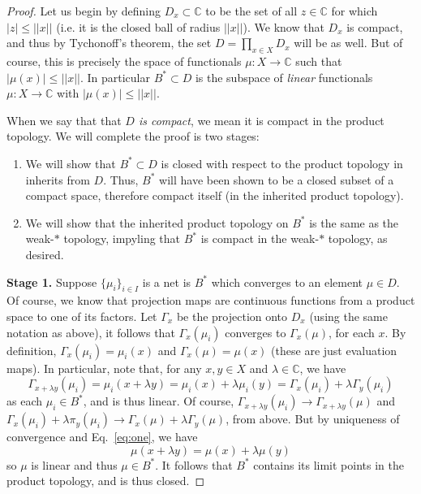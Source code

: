 \documentclass[aps,pra,showpacs,notitlepage,onecolumn,superscriptaddress,nofootinbib]{revtex4-1}
\theoremstyle{definition}
\begin{document}
\begin{proof}
  Let us begin by defining $D_x \subset \mathbb{C}$ to be the set of all $z \in \mathbb{C}$ for which $|z| \leq ||x||$ (i.e. it is the closed ball of radius $||x||$).
  We know that $D_x$ is compact, and thus by Tychonoff's theorem, the set $D = \prod_{x \in X} D_x$ will be as well. But of course, this is precisely the space of functionals $\mu : X \rightarrow \mathbb{C}$
  such that $|\mu(x)| \leq ||x||$. In particular $B^{*} \subset D$ is the subspace of \emph{linear} functionals $\mu : X \rightarrow \mathbb{C}$ with $|\mu(x)| \leq ||x||$.

  When we say that that \emph{$D$ is compact}, we mean it is compact in the product topology. We will complete the proof is two stages:
  \begin{enumerate}
  \item We will show that $B^{*} \subset D$ is closed with respect to the product topology in inherits from $D$. Thus, $B^{*}$ will
    have been shown to be a closed subset of a compact space, therefore compact itself (in the inherited product topology).
  \item We will show that the inherited product topology on $B^{*}$ is the same as the weak-$*$ topology, impyling that $B^{*}$ is compact in
    the weak-$*$ topology, as desired.
  \end{enumerate}
  \textbf{Stage 1.} Suppose $\{\mu_i\}_{i \in I}$ is a net is $B^{*}$ which converges to an element $\mu \in D$. Of course, we know that projection
  maps are continuous functions from a product space to one of its factors. Let $\Gamma_x$ be the projection onto $D_x$ (using the same notation as above), it follows that $\Gamma_x(\mu_i)$
  converges to $\Gamma_x(\mu)$, for each $x$. By definition, $\Gamma_x(\mu_i) = \mu_i(x)$ and $\Gamma_x(\mu) = \mu(x)$ (these are just evaluation maps). In particular,
  note that, for any $x, y \in X$ and $\lambda \in \mathbb{C}$, we have
  \begin{equation}
    \label{eq:one}
    \Gamma_{x + \lambda y}(\mu_i) = \mu_i(x + \lambda y) = \mu_i(x) + \lambda \mu_i(y) = \Gamma_x(\mu_i) + \lambda \Gamma_y(\mu_i)
  \end{equation}
  as each $\mu_i \in B^{*}$, and is thus linear. Of course, $\Gamma_{x + \lambda y}(\mu_i) \rightarrow \Gamma_{x + \lambda y}(\mu)$
  and $\Gamma_x(\mu_i) + \lambda \pi_y(\mu_i) \rightarrow \Gamma_x(\mu) + \lambda \Gamma_y(\mu)$, from above. But by uniqueness of convergence and Eq.~\eqref{eq:one}, we have
  \begin{equation}
    \mu(x + \lambda y) = \mu(x) + \lambda \mu(y)
  \end{equation}
  so $\mu$ is linear and thus $\mu \in B^{*}$. It follows that $B^{*}$ contains its limit points in the product topology, and is thus closed.
  \newline


\end{proof}
\end{document}
